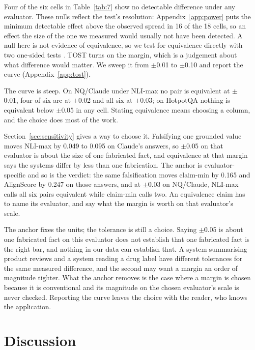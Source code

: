 \documentclass[11pt]{article}
\begin{document}
Four of the six cells in Table~\ref{tab:7} show no detectable difference under any evaluator. These nulls reflect the test's resolution: Appendix~\ref{app:power} puts the minimum detectable effect above the observed spread in 16 of the 18 cells, so an effect the size of the one we measured would usually not have been detected. A null here is not evidence of equivalence, so we test for equivalence directly with two one-sided tests \citep{schuirmann-1987}. TOST turns on the margin, which is a judgement about what difference would matter. We sweep it from $\pm$0.01 to $\pm$0.10 and report the curve (Appendix~\ref{app:tost}).

The curve is steep. On NQ/Claude under NLI-max no pair is equivalent at $\pm$0.01, four of six are at $\pm$0.02 and all six at $\pm$0.03; on HotpotQA nothing is equivalent below $\pm$0.05 in any cell. Stating equivalence means choosing a column, and the choice does most of the work.

Section~\ref{sec:sensitivity} gives a way to choose it. Falsifying one grounded value moves NLI-max by 0.049 to 0.095 on Claude's answers, so $\pm$0.05 on that evaluator is about the size of one fabricated fact, and equivalence at that margin says the systems differ by less than one fabrication. The anchor is evaluator-specific and so is the verdict: the same falsification moves claim-min by 0.165 and AlignScore by 0.247 on those answers, and at $\pm$0.03 on NQ/Claude, NLI-max calls all six pairs equivalent while claim-min calls two. An equivalence claim has to name its evaluator, and say what the margin is worth on that evaluator's scale.

The anchor fixes the units; the tolerance is still a choice. Saying $\pm$0.05 is about one fabricated fact on this evaluator does not establish that one fabricated fact is the right bar, and nothing in our data can establish that. A system summarising product reviews and a system reading a drug label have different tolerances for the same measured difference, and the second may want a margin an order of magnitude tighter. What the anchor removes is the case where a margin is chosen because it is conventional and its magnitude on the chosen evaluator's scale is never checked. Reporting the curve leaves the choice with the reader, who knows the application.



\section{Discussion}
\label{sec:discussion}
\end{document}
